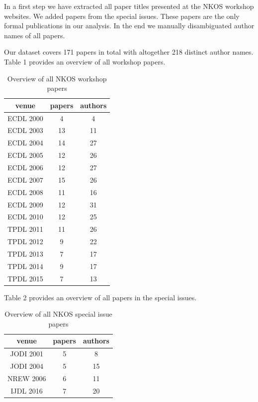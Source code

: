 \documentclass[runningheads,a4paper]{llncs}
\begin{document}
In a first step we have extracted all paper titles presented at the NKOS workshop websites. We added papers from the special issues. These papers are the only formal publications in our analysis.  In the end we manually disambiguated author names of all papers.

Our dataset covers 171 papers in total with altogether 218 distinct author names. Table 1 provides an overview of all workshop papers. 

\begin{table}
	\centering
	\caption{Overview of all NKOS workshop papers}
\begin{tabular}	{|c|c|c|}		%
	\hline 
	venue& papers  & authors  \\ 
	\hline 
	ECDL 2000& 4 & 4 \\ 
	\hline 
	ECDL 2003& 13 & 11 \\ 
	\hline 
	ECDL 2004& 14 & 27 \\ 
	\hline 
	ECDL 2005& 12 & 26 \\ 
	\hline 
	ECDL 2006& 12 & 27 \\ 
	\hline 
	ECDL 2007& 15 & 26 \\ 
	\hline 
	ECDL 2008& 11 & 16 \\ 
	\hline 
	ECDL 2009& 12 & 31 \\ 
	\hline 
	ECDL 2010& 12 & 25 \\ 
	\hline 
	TPDL 2011& 11 & 26 \\ 
	\hline 
	TPDL 2012& 9 & 22 \\ 
	\hline 
	TPDL 2013& 7 & 17 \\ 
	\hline 
	TPDL 2014& 9 & 17 \\ 
	\hline 
	TPDL 2015& 7 & 13 \\ 
	\hline 
\end{tabular} 
\label{tab:workshops}
\end{table}


Table 2 provides an overview of all papers in the special issues. 

\begin{table}
	\centering
	\caption{Overview of all NKOS special issue papers}
\begin{tabular}{|c|c|c|}  %
	\hline 
	venue& papers  & authors  \\ 
	\hline 
	JODI 2001 \cite{Hill2001} & 5 & 8 \\ 
	\hline 
	JODI 2004 \cite{Tudhope2004} & 5 & 15 \\ 
	\hline 
	NREW 2006 \cite{Tudhope2006} & 6 & 11 \\ 
	\hline 
	IJDL 2016 \cite{Mayr2016} & 7 &  20\\ 
	\hline 
\end{tabular} 
\label{tab:SI}
\end{table}
\end{document}
